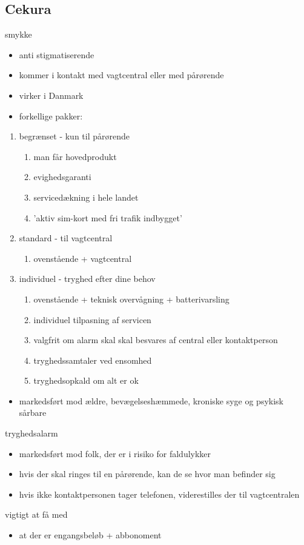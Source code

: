 \subsection{Cekura}
smykke 
\begin{itemize}
    \item anti stigmatiserende
    \item kommer i kontakt med vagtcentral eller med pårørende
    \item virker i Danmark
    \item forkellige pakker:
\end{itemize}
    \begin{enumerate}
        \item begrænset - kun til pårørende
        \begin{enumerate}
            \item man får hovedprodukt
            \item evighedsgaranti
            \item servicedækning i hele landet
            \item 'aktiv sim-kort med fri trafik indbygget'
        \end{enumerate}
        \item standard - til vagtcentral
        \begin{enumerate}
            \item ovenstående + vagtcentral
        \end{enumerate}
        \item individuel - tryghed efter dine behov
        \begin{enumerate}
            \item ovenstående + teknisk overvågning + batterivarsling
            \item individuel tilpasning af servicen
            \item valgfrit om alarm skal skal besvares af central eller kontaktperson
            \item tryghedssamtaler ved ensomhed
            \item tryghedsopkald om alt er ok
        \end{enumerate}
    \end{enumerate}
\begin{itemize}
    \item markedsført mod ældre, bevægelseshæmmede, kroniske syge og psykisk sårbare
\end{itemize}


tryghedsalarm
\begin{itemize}
    \item markedsført mod folk, der er i risiko for faldulykker
    \item hvis der skal ringes til en pårørende, kan de se hvor man befinder sig
    \item hvis ikke kontaktpersonen tager telefonen, viderestilles der til vagtcentralen
\end{itemize}

vigtigt at få med
\begin{itemize}
    \item at der er engangsbeløb + abbonoment
\end{itemize}